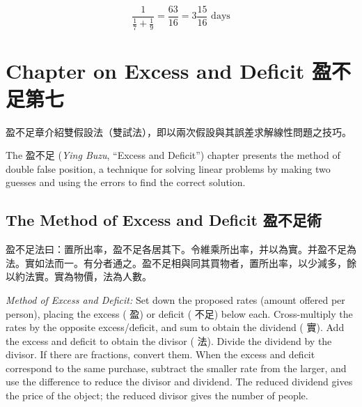 \documentclass[11pt,a4paper]{article}
\newcommand{\zh}[1]{{\CJKfamily{\CJKrmdefault} #1}}
\newenvironment{chside}{%
  \begin{minipage}[t]{0.48\textwidth}%
  \setlength{\parindent}{1.5em}%
  \linespread{1.25}\selectfont%
  \small%
}{%
  \end{minipage}%
}
\newenvironment{enside}{%
  \hfill\begin{minipage}[t]{0.48\textwidth}%
  \setlength{\parindent}{1em}%
  \linespread{1.15}\selectfont%
  \small%
}{%
  \end{minipage}%
}
\begin{document}
\begin{equation*}
\frac{1}{\frac{1}{7} + \frac{1}{9}} = \frac{63}{16} = 3\frac{15}{16} \text{ days}
\end{equation*}

\newpage

\section{Chapter on Excess and Deficit \zh{盈不足第七}}
\label{sec:yingbuzu}

\noindent\begin{chside}
\zh{盈不足}章介紹雙假設法（雙試法），即以兩次假設與其誤差求解線性問題之技巧。
\end{chside}%
\begin{enside}
The \zh{盈不足} (\textit{Ying Buzu}, ``Excess and Deficit'') chapter
presents the method of double false position, a technique for solving linear
problems by making two guesses and using the errors to find the correct
solution.
\end{enside}

\subsection{The Method of Excess and Deficit \zh{盈不足術}}

\noindent\begin{chside}
\zh{盈不足法曰：置所出率，盈不足各居其下。令維乘所出率，并以為實。并盈不足為法。實如法而一。有分者通之。盈不足相與同其買物者，置所出率，以少減多，餘以約法實。實為物價，法為人數。}
\end{chside}%
\begin{enside}
\textit{Method of Excess and Deficit:} Set down the proposed rates (amount
offered per person), placing the excess (\zh{盈}) or deficit (\zh{不足})
below each. Cross-multiply the rates by the opposite excess/deficit, and sum
to obtain the dividend (\zh{實}). Add the excess and deficit to obtain the
divisor (\zh{法}). Divide the dividend by the divisor. If there are
fractions, convert them. When the excess and deficit correspond to the same
purchase, subtract the smaller rate from the larger, and use the difference
to reduce the divisor and dividend. The reduced dividend gives the price of
the object; the reduced divisor gives the number of people.
\end{enside}
\end{document}
